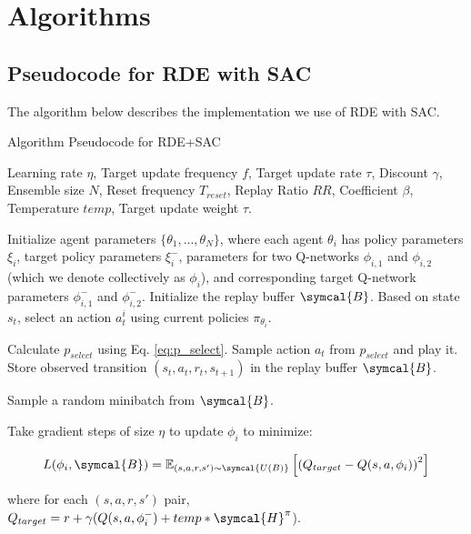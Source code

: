 \documentclass[base]{subfiles}
\begin{document}
\section{Algorithms} \label{app:a}

\subsection{Pseudocode for RDE with SAC}

The algorithm below describes the implementation we use of RDE with SAC.

\begin{algorithm}
	\caption{Algorithm Pseudocode for RDE+SAC}
	\label{alg:rde_sac}
	\begin{algorithmic}[1]
		\Require Learning rate $\eta$, Target update frequency $f$, Target update rate $\tau$, Discount $\gamma$, Ensemble size $N$, Reset frequency $T_{reset}$, Replay Ratio $RR$, Coefficient $\beta$, Temperature $temp$, Target update weight $\tau$.

		\State Initialize agent parameters $\{ \theta_1, ..., \theta_N \}$, where each agent $\theta_i$ has policy parameters $\xi_i$, target policy parameters $\xi_i^{-}$, parameters for two Q-networks $\phi_{i,1}$ and $\phi_{i,2}$ (which we denote collectively as $\phi_i$), and corresponding target Q-network parameters $\phi_{i,1}^{-}$ and $\phi_{i,2}^{-}$.
		\State Initialize the replay buffer $\symcal{B}$.
		\State Based on state $s_t$, select an action $a_t^i$ using current policies $\pi_{\theta_i}$.
		\EndFor

		\State Calculate $p_{select}$ using Eq. \ref{eq:p_select}.
		\State Sample action $a_t$ from $p_{select}$ and play it.
		\State Store observed transition $(s_t, a_t, r_t, s_{t+1})$ in the replay buffer $\symcal{B}$.

		\State Sample a random minibatch from $\symcal{B}$.


		\State Take gradient steps of size $\eta$ to update $\phi_i$ to minimize:

		\begin{equation}
			\notag
			L(\phi_i, \symcal{B}) = \mathbb{E}_{(s, a, r, s') \sim \symcal{U(B)}} \left[ \left( Q_{target} - Q(s, a, \phi_i)  \right)^2 \right]
		\end{equation}

		where for each $(s,a,r,s')$ pair, $Q_{target} = r + \gamma (Q(s,a,\phi_i^{-}) + temp*\symcal{H}^{\pi}$).


\end{algorithmic}
\end{algorithm}
\end{document}
